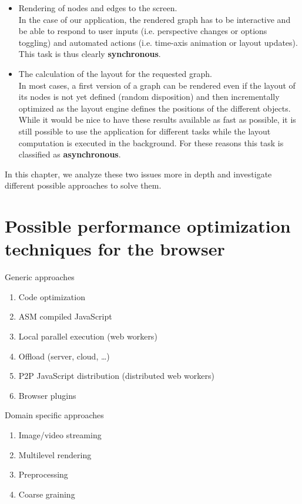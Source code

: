 \begin{itemize}
    \item Rendering of nodes and edges to the screen.\\[1.5mm]
        In the case of our application, the rendered graph has to be interactive and be able to respond to user inputs (i.e. perspective changes or options toggling) and automated actions (i.e. time-axis animation or layout updates). This task is thus clearly \textbf{synchronous}.

    \item The calculation of the layout for the requested graph.\\[1.5mm]
        In most cases, a first version of a graph can be rendered even if the layout of its nodes is not yet defined (random disposition) and then incrementally optimized as the layout engine defines the positions of the different objects. While it would be nice to have these results available as fast as possible, it is still possible to use the application for different tasks while the layout computation is executed in the background. For these reasons this task is classified as \textbf{asynchronous}.
\end{itemize}

In this chapter, we analyze these two issues more in depth and investigate different possible approaches to solve them.


\section{Possible performance optimization techniques for the browser}

Generic approaches
\begin{enumerate}
    \item Code optimization
    \item ASM compiled JavaScript
    \item Local parallel execution (web workers)
    \item Offload (server, cloud, \ldots)
    \item P2P JavaScript distribution (distributed web workers)
    \item Browser plugins
\end{enumerate}

Domain specific approaches
\begin{enumerate}
    \item Image/video streaming
    \item Multilevel rendering
    \item Preprocessing
    \item Coarse graining
\end{enumerate}

